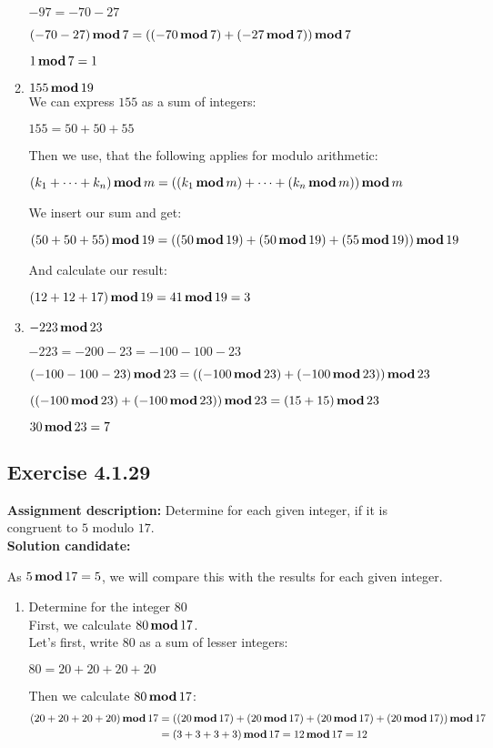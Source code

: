 \documentclass{report}
\newcommand{\cent}[1]{\begin{center}#1\end{center}}
\newcommand{\mAlign}[1]{\begin{align*}#1\end{align*}}
\newcommand{\assignmentDescription}{\textbf{Assignment description: }}
\newcommand{\solution}{\textbf{Solution candidate: }}
\newcommand{\Exercise}[1]{\subsection{Exercise #1}}
\newcommand{\defaultEnumerateLabel}{\textbf{\alph*.}}
\newcommand{\modFunc}{\text{\,\textbf{mod}\,}}
\newcommand{\myItem}[1]{\item #1\\}
\begin{document}
\begin{enumerate}[label=\defaultEnumerateLabel]
\begin{enumerate}[label=\defaultEnumerateLabel]
		\cent{$-97 = -70 -27$}
		
		\cent{$(-70-27) \modFunc 7 = ((-70 \modFunc 7) + (-27 \modFunc 7)) \modFunc 7 $}
		
		\cent{$ 1 \modFunc 7 = 1 $}
		
		\myItem{$155 \modFunc 19$}
		
		We can express $155$ as a sum of integers:
		
		\cent{$155 =  50 + 50 + 55$}
		
		Then we use, that the following applies for modulo arithmetic:
		
		\cent{$(k_1  + \dots + k_n) \modFunc m = ((k_1 \modFunc m) + \dots + (k_n \modFunc m)) \modFunc m$}
		
		We insert our sum and get:
		\small
		\cent{$ (50 + 50 + 55) \modFunc 19 = ((50 \modFunc 19) + (50 \modFunc 19) + (55 \modFunc 19)) \modFunc 19$}
		\normalsize
		
		And calculate our result:
		
		\cent{$(12 + 12 + 17) \modFunc 19  = 41 \modFunc 19 = 3$}
		
		\myItem{$-223 \modFunc 23$}
		
		\cent{$-223 = -200 - 23 = -100-100-23$}
		\small
		\cent{$(-100-100-23) \modFunc 23 = ((-100 \modFunc 23) + (-100 \modFunc 23)) \modFunc 23$}
		\normalsize
		
		\cent{$((-100 \modFunc 23) + (-100 \modFunc 23)) \modFunc 23 = (15+15) \modFunc 23$}
		
		\cent{$30 \modFunc 23 = 7$}
		
	\end{enumerate}
	
	\Exercise{4.1.29}
	\assignmentDescription
	Determine for each given integer, if it is congruent to $5$ modulo $17$.\\
	
	\solution
	
	As $5 \modFunc 17 = 5$, we will compare this with the results for each given integer.\\
	\begin{enumerate} [label=\defaultEnumerateLabel]
		\myItem{Determine for the integer 80}
		
		First, we calculate $80 \modFunc 17$.\\
		
		Let's first, write 80 as a sum of lesser integers:
		\cent{$ 80  = 20 + 20 + 20 + 20$}
		
		Then we calculate $80 \modFunc 17$:
		\tiny
		\mAlign{(20+20+20+20) \modFunc 17 &= ((20 \modFunc 17) + (20 \modFunc 17) + (20 \modFunc 17) + (20 \modFunc 17)) \modFunc 17 \\
						&= (3+3+3+3) \modFunc17 = 12 \modFunc 17 = 12}
		\normalsize
		

\end{enumerate}
\end{enumerate}
\end{document}
